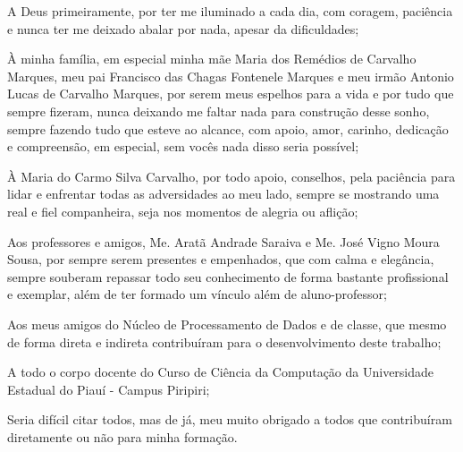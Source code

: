 
\begin{agradecimentos}[AGRADECIMENTOS]
A Deus primeiramente, por ter me iluminado a cada dia, com coragem, paciência e nunca ter me deixado abalar por nada, apesar da dificuldades;

À minha família, em especial minha mãe Maria dos Remédios de Carvalho Marques, meu pai Francisco das Chagas Fontenele Marques e meu irmão Antonio Lucas de Carvalho Marques, por serem meus espelhos para a vida e por tudo que sempre fizeram, nunca deixando me faltar nada para construção desse sonho, sempre fazendo tudo que esteve ao alcance, com apoio, amor, carinho, dedicação e compreensão, em especial, sem vocês nada disso seria possível;

À Maria do Carmo Silva Carvalho, por todo apoio, conselhos, pela paciência para lidar e enfrentar todas as adversidades ao meu lado, sempre se mostrando uma real e fiel companheira, seja nos momentos de alegria ou aflição;

Aos professores e amigos, Me. Aratã Andrade Saraiva e Me. José Vigno Moura Sousa, por sempre serem presentes e empenhados, que com calma e elegância, sempre souberam repassar todo seu conhecimento de forma bastante profissional e exemplar, além de ter formado um vínculo além de aluno-professor;

Aos meus amigos do Núcleo de Processamento de Dados e de classe, que mesmo de forma direta e indireta contribuíram para o desenvolvimento deste trabalho;

A todo o corpo docente do Curso de Ciência da Computação da Universidade Estadual do Piauí - Campus Piripiri;

Seria difícil citar todos, mas de já, meu muito obrigado a todos que contribuíram diretamente ou não para minha formação.


\end{agradecimentos} 

\newpage